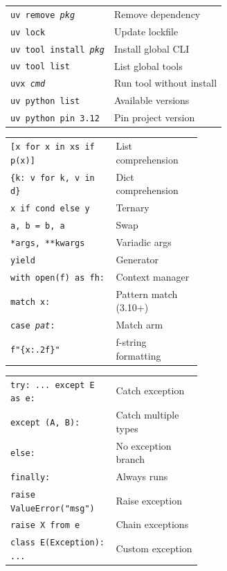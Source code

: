 \documentclass[10pt]{extarticle}
\begin{document}
\begin{multicols}{2}

\begin{tabularx}{\linewidth}{@{}l@{\enspace}Y@{}}
\texttt{uv remove \textit{pkg}}       & Remove dependency \\
\texttt{uv lock}                       & Update lockfile \\
\texttt{uv tool install \textit{pkg}} & Install global CLI \\
\texttt{uv tool list}                  & List global tools \\
\texttt{uvx \textit{cmd}}             & Run tool without install \\
\texttt{uv python list}               & Available versions \\
\texttt{uv python pin 3.12}           & Pin project version \\
\end{tabularx}

\begin{tabularx}{\linewidth}{@{}>{\raggedright\arraybackslash}p{0.55\linewidth}@{\enspace}Y@{}}
\texttt{[x for x in xs if p(x)]}     & List comprehension \\
\texttt{\{k: v for k, v in d\}}      & Dict comprehension \\
\texttt{x if cond else y}            & Ternary \\
\texttt{a, b = b, a}                 & Swap \\
\texttt{*args, **kwargs}             & Variadic args \\
\texttt{yield}                       & Generator \\
\texttt{with open(f) as fh:}         & Context manager \\
\texttt{match x:}                    & Pattern match (3.10+) \\
\texttt{case \textit{pat}:}          & Match arm \\
\texttt{f"\{x:.2f\}"}               & f-string formatting \\
\end{tabularx}

\begin{tabularx}{\linewidth}{@{}>{\raggedright\arraybackslash}p{0.55\linewidth}@{\enspace}Y@{}}
\texttt{try: ... except E as e:}     & Catch exception \\
\texttt{except (A, B):}              & Catch multiple types \\
\texttt{else:}                       & No exception branch \\
\texttt{finally:}                    & Always runs \\
\texttt{raise ValueError("msg")}     & Raise exception \\
\texttt{raise X from e}              & Chain exceptions \\
\texttt{class E(Exception): ...}     & Custom exception \\
\end{tabularx}


\end{multicols}
\end{document}
